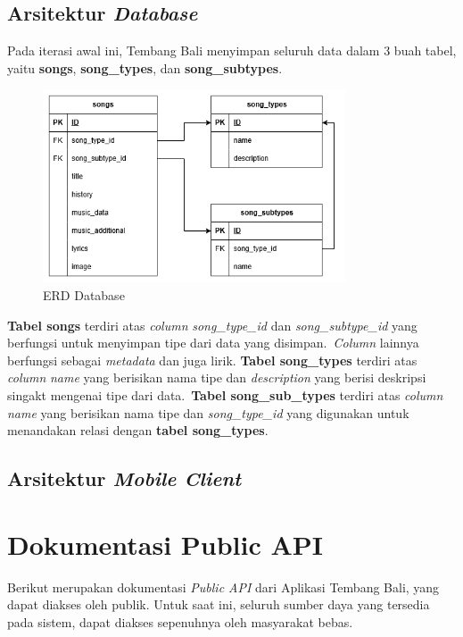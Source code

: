 \documentclass[a4paper, 12pt]{article}
\begin{document}
\subsection{Arsitektur \textit{Database}}
Pada iterasi awal ini, Tembang Bali menyimpan seluruh data dalam 3 buah tabel, yaitu \textbf{songs}, \textbf{song\_types}, dan \textbf{song\_subtypes}.

\begin{figure}[h]
    \centering
    \includegraphics[width=0.8\textwidth]{assets/erd.png}
    \caption{ERD Database}
\end{figure}

\textbf{Tabel songs} terdiri atas \textit{column} \textit{song\_type\_id} dan \textit{song\_subtype\_id} yang berfungsi untuk menyimpan tipe dari data yang disimpan.\
\textit{Column} lainnya berfungsi sebagai \textit{metadata} dan juga lirik.
\textbf{Tabel song\_types} terdiri atas \textit{column} \textit{name} yang berisikan nama tipe dan \textit{description} yang berisi deskripsi singakt mengenai tipe dari data.\
\textbf{Tabel song\_sub\_types} terdiri atas \textit{column} \textit{name} yang berisikan nama tipe dan \textit{song\_type\_id} yang digunakan untuk menandakan relasi dengan \textbf{tabel song\_types}.\

\subsection{Arsitektur \textit{Mobile Client}}

\section{Dokumentasi Public API}
Berikut merupakan dokumentasi \textit{Public API} dari Aplikasi Tembang Bali, yang dapat diakses oleh publik. Untuk saat ini, seluruh sumber daya yang tersedia pada sistem, dapat diakses sepenuhnya oleh masyarakat bebas.\
\end{document}
